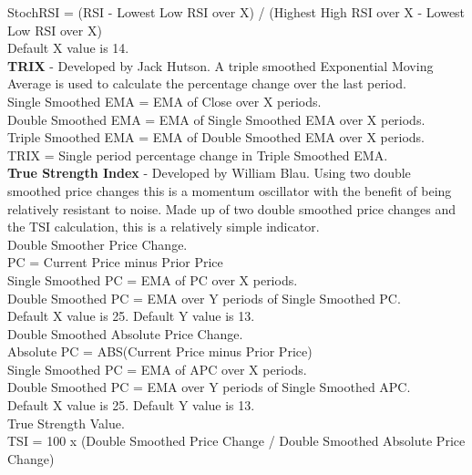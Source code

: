 \documentclass[12pt,a4paper]{article}
\begin{document}
StochRSI = (RSI - Lowest Low RSI over X) / (Highest High RSI over X - Lowest Low RSI over X)\\
Default X value is 14.\\

\iffalse
[]
\fi

\textbf{TRIX} - Developed by Jack Hutson. A triple smoothed Exponential Moving Average is used to calculate the percentage change over the last period.\\

Single Smoothed EMA = EMA of Close over X periods.\\
Double Smoothed EMA = EMA of Single Smoothed EMA over X periods.\\
Triple Smoothed EMA = EMA of Double Smoothed EMA over X periods.\\
TRIX = Single period percentage change in Triple Smoothed EMA. \\

\iffalse
[]
\fi

\textbf{True Strength Index} - Developed by William Blau. Using two double smoothed price changes this is a momentum oscillator with the benefit of being relatively resistant to noise. Made up of two double smoothed price changes and the TSI calculation, this is a relatively simple indicator.\\

Double Smoother Price Change.\\
PC = Current Price minus Prior Price\\
Single Smoothed PC = EMA of PC over X periods.\\
Double Smoothed PC = EMA over Y periods of Single Smoothed PC.\\
Default X value is 25. Default Y value is 13.\\

Double Smoothed Absolute Price Change. \\
Absolute PC = ABS(Current Price minus Prior Price)\\
Single Smoothed PC = EMA of APC over X periods.\\
Double Smoothed PC = EMA over Y periods of Single Smoothed APC.\\
Default X value is 25. Default Y value is 13.\\

True Strength Value.\\
TSI = 100 x (Double Smoothed Price Change / Double Smoothed Absolute Price Change)\\
\end{document}
